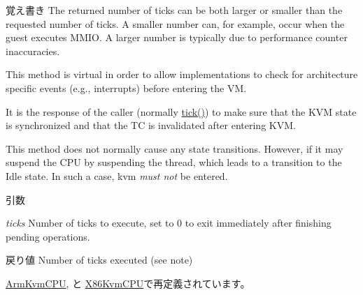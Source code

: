 \begin{DoxyNote}{覚え書き}
The returned number of ticks can be both larger or smaller than the requested number of ticks. A smaller number can, for example, occur when the guest executes MMIO. A larger number is typically due to performance counter inaccuracies.

This method is virtual in order to allow implementations to check for architecture specific events (e.g., interrupts) before entering the VM.

It is the response of the caller (normally \hyperlink{classBaseKvmCPU_a873dd91783f9efb4a590aded1f70d6b0}{tick()}) to make sure that the KVM state is synchronized and that the TC is invalidated after entering KVM.

This method does not normally cause any state transitions. However, if it may suspend the CPU by suspending the thread, which leads to a transition to the Idle state. In such a case, kvm {\itshape must not\/} be entered.
\end{DoxyNote}

\begin{DoxyParams}{引数}
\item[{\em ticks}]Number of ticks to execute, set to 0 to exit immediately after finishing pending operations. \end{DoxyParams}
\begin{DoxyReturn}{戻り値}
Number of ticks executed (see note) 
\end{DoxyReturn}


\hyperlink{classArmKvmCPU_aed3dbd0c0bf26d82ee56367a3f350506}{ArmKvmCPU}, と \hyperlink{classX86KvmCPU_aed3dbd0c0bf26d82ee56367a3f350506}{X86KvmCPU}で再定義されています。



